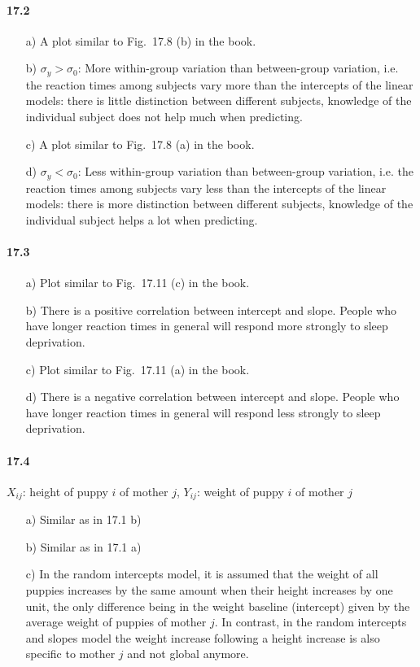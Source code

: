 \documentclass[fontsize=11pt,DIV=18,parskip=half]{scrartcl}
\begin{document}
\paragraph{17.2}

\begin{itemize}
\item[a)] A plot similar to Fig.\ 17.8 (b) in the book.
\item[b)] $\sigma_y > \sigma_0$: More within-group variation than between-group variation, i.e. the reaction times among subjects vary more than the intercepts of the linear models: there is little distinction between different subjects, knowledge of the individual subject does not help much when predicting.
\item[c)] A plot similar to Fig.\ 17.8 (a) in the book.
\item[d)] $\sigma_y < \sigma_0$: Less within-group variation than between-group variation, i.e. the reaction times among subjects vary less than the intercepts of the linear models: there is more distinction between different subjects, knowledge of the individual subject helps a lot when predicting.
\end{itemize}

\paragraph{17.3}
\begin{itemize}
\item[a)] Plot similar to Fig.\ 17.11 (c) in the book.
\item[b)] There is a positive correlation between intercept and slope. People who have longer reaction times in general will respond more strongly to sleep deprivation.
\item[c)] Plot similar to Fig.\ 17.11 (a) in the book.
\item[d)] There is a negative correlation between intercept and slope. People who have longer reaction times in general will respond less strongly to sleep deprivation.
\end{itemize}

\paragraph{17.4}

$X_{ij}$: height of puppy $i$ of mother $j$, $Y_{ij}$: weight of puppy $i$ of mother $j$

\begin{itemize}
\item[a)] Similar as in 17.1 b)
\item[b)] Similar as in 17.1 a)
\item[c)] In the random intercepts model, it is assumed that the weight of all puppies increases by the same amount when their height increases by one unit, the only difference being in the weight baseline (intercept) given by the average weight of puppies of mother $j$. In contrast, in the random intercepts and slopes model the weight increase following a height increase is also specific to mother $j$ and not global anymore.
\end{itemize}
\end{document}
